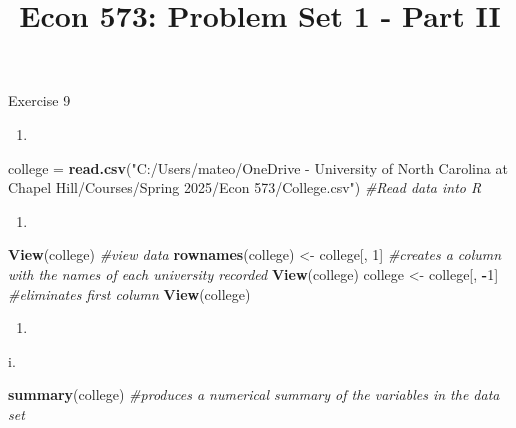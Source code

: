 \documentclass[
]{article}
\title{Econ 573: Problem Set 1 - Part II}
\author{}
\date{\vspace{-2.5em}}
\newenvironment{Shaded}{\begin{snugshade}}{\end{snugshade}}
\newcommand{\CommentTok}[1]{\textcolor[rgb]{0.56,0.35,0.01}{\textit{#1}}}
\newcommand{\DecValTok}[1]{\textcolor[rgb]{0.00,0.00,0.81}{#1}}
\newcommand{\FunctionTok}[1]{\textcolor[rgb]{0.13,0.29,0.53}{\textbf{#1}}}
\newcommand{\NormalTok}[1]{#1}
\newcommand{\OtherTok}[1]{\textcolor[rgb]{0.56,0.35,0.01}{#1}}
\newcommand{\SpecialCharTok}[1]{\textcolor[rgb]{0.81,0.36,0.00}{\textbf{#1}}}
\newcommand{\StringTok}[1]{\textcolor[rgb]{0.31,0.60,0.02}{#1}}
\providecommand{\tightlist}{%
  \setlength{\itemsep}{0pt}\setlength{\parskip}{0pt}}
\begin{document}
\maketitle

Exercise 9

\begin{enumerate}
\def\labelenumi{(\alph{enumi})}
\tightlist
\item
\end{enumerate}

\begin{Shaded}
\begin{Highlighting}[]
\NormalTok{college }\OtherTok{=} \FunctionTok{read.csv}\NormalTok{(}\StringTok{"C:/Users/mateo/OneDrive {-} University of North Carolina at Chapel Hill/Courses/Spring 2025/Econ 573/College.csv"}\NormalTok{) }\CommentTok{\#Read data into R}
\end{Highlighting}
\end{Shaded}

\begin{enumerate}
\def\labelenumi{(\alph{enumi})}
\setcounter{enumi}{1}
\tightlist
\item
\end{enumerate}

\begin{Shaded}
\begin{Highlighting}[]
\FunctionTok{View}\NormalTok{(college)}
\CommentTok{\#view data}
\FunctionTok{rownames}\NormalTok{(college) }\OtherTok{\textless{}{-}}\NormalTok{ college[, }\DecValTok{1}\NormalTok{] }\CommentTok{\#creates a column with the names of each university recorded}
\FunctionTok{View}\NormalTok{(college)}
\NormalTok{college }\OtherTok{\textless{}{-}}\NormalTok{ college[, }\SpecialCharTok{{-}}\DecValTok{1}\NormalTok{] }\CommentTok{\#eliminates first column}
\FunctionTok{View}\NormalTok{(college)}
\end{Highlighting}
\end{Shaded}

\begin{enumerate}
\def\labelenumi{(\alph{enumi})}
\setcounter{enumi}{2}
\tightlist
\item
\end{enumerate}

i.

\begin{Shaded}
\begin{Highlighting}[]
\FunctionTok{summary}\NormalTok{(college) }\CommentTok{\#produces a numerical summary of the variables in the data set}
\end{Highlighting}
\end{Shaded}
\end{document}
